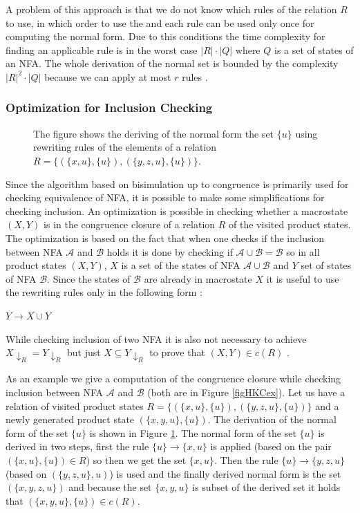 A problem of this approach is that we do not know which rules of the relation $R$ to use, in which order to use the 
and each rule can be used only once for computing the normal form. 
Due to this conditions the time complexity for finding an applicable rule is in the worst case $|R|\cdot|Q|$ where $Q$ is a set of states of an NFA.
The whole derivation of the normal set is bounded by the complexity $|R|^2 \cdot |Q|$ because we can apply at most $r$ rules \cite{popl13}.

\subsubsection{Optimization for Inclusion Checking}
\label{congrOpt}
\begin{figure}[bt]
  \begin{center}
    
    \caption{The figure shows the deriving of the normal form the set $\{u\}$ using rewriting
      rules of the elements of a relation $R=\{(\{x,u\},\{u\}),(\{y,z,u\},\{u\})\}$.}
    \label{figHKCRewO}
  \end{center}
\end{figure}
Since the algorithm based on bisimulation up to congruence is primarily used for checking equivalence of NFA, it is possible to make some simplifications for
checking inclusion. An optimization is possible in checking whether a macrostate $(X,Y)$ is in the congruence closure of a relation $R$ of the visited
product states. The optimization
is based on the fact that when one checks if the inclusion between NFA $\mathcal{A}$ and $\mathcal{B}$ holds it is done by checking if $\mathcal{A}\cup\mathcal{B}=
\mathcal{B}$ so in all product states $(X,Y)$, $X$ is a set of the states of NFA $\mathcal{A}\cup\mathcal{B}$ and $Y$ set of states of NFA $\mathcal{B}$. Since the
states of $\mathcal{B}$ are already in macrostate $X$ it is useful to use the rewriting rules only in the following form \cite{popl13}:
\begin{center}
$Y\rightarrow X\cup Y$
\end{center}
While checking inclusion of two NFA it is also not necessary to achieve $X{\downarrow_R}=Y{\downarrow_R}$ 
but just $X \subseteq Y{\downarrow_R}$ to prove that $(X,Y)\in c(R)$ \cite{popl13}.

As an example we give a computation of the congruence closure while checking inclusion between NFA $\mathcal{A}$ and $\mathcal{B}$ (both are in Figure 
\ref{figHKCex}). Let us have a relation of visited product states $R=\{(\{x,u\},\{u\}),(\{y,z,u\},\{u\})\}$ and a 
newly generated product state $(\{x,y,u\},\{u\})$. The
derivation of the normal form of the set $\{u\}$ is shown in Figure \ref{figHKCRewO}. 
The normal form of the set $\{u\}$ is derived in two steps, first the rule $\{u\}\rightarrow\{x,u\}$ is applied (based on the pair $(\{x,u\},\{u\})\in R$) 
so then we get the set $\{x,u\}$. 
Then the rule $\{u\}\rightarrow\{y,z,u\}$ (based on $(\{y,z,u\},u)$) is used and the finally derived normal form is the set $(\{x,y,z,u\})$ 
and because the set $\{x,y,u\}$ is subset of the derived set it holds that $(\{x,y,u\},\{u\})\in c(R)$.

